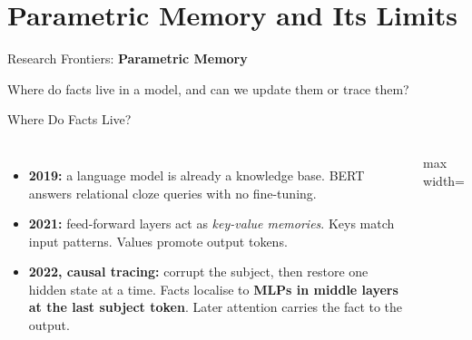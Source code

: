 \section{Parametric Memory and Its Limits}

\begin{frame}{}
    \LARGE Research Frontiers: \textbf{Parametric Memory}

    \vspace{1em}
    \normalsize Where do facts live in a model, and can we update them or trace them?
\end{frame}

\begin{frame}{Where Do Facts Live?}
    \begin{columns}[T,onlytextwidth]
        \begin{itemize}\itemsep0.45em
            \item \textbf{2019:} a language model is already a knowledge base. BERT answers relational cloze queries with no fine-tuning.
            \item \textbf{2021:} feed-forward layers act as \emph{key-value memories}. Keys match input patterns. Values promote output tokens.
            \item \textbf{2022, causal tracing:} corrupt the subject, then restore one hidden state at a time. Facts localise to \textbf{MLPs in middle layers at the last subject token}. Later attention carries the fact to the output.
        \end{itemize}
        \centering
        \begin{adjustbox}{max width=\linewidth}\end{adjustbox}


\end{columns}
\end{frame}
